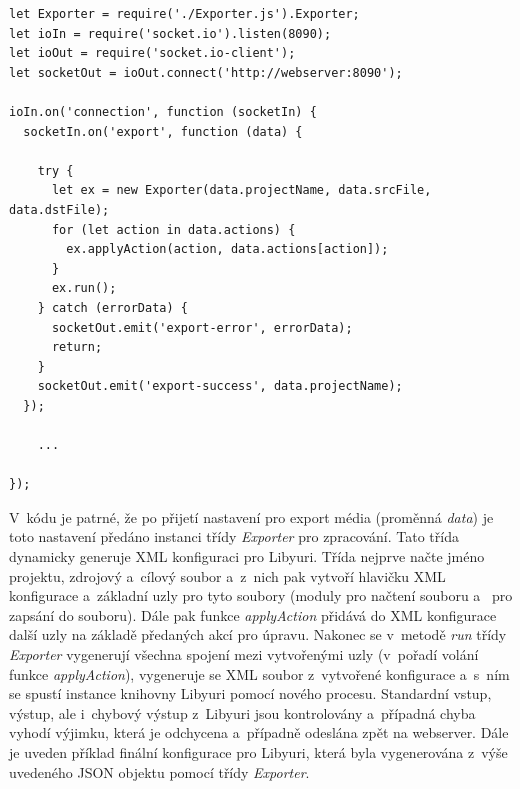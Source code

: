 \documentclass[thesis=M,czech]{FITthesis}[2012/06/26]
\begin{document}
\begin{lstlisting}[style=htmlcssjs]
let Exporter = require('./Exporter.js').Exporter;
let ioIn = require('socket.io').listen(8090);
let ioOut = require('socket.io-client');
let socketOut = ioOut.connect('http://webserver:8090');

ioIn.on('connection', function (socketIn) {
  socketIn.on('export', function (data) {

    try {
      let ex = new Exporter(data.projectName, data.srcFile, data.dstFile);
      for (let action in data.actions) {
        ex.applyAction(action, data.actions[action]);
      }
      ex.run();
    } catch (errorData) {
      socketOut.emit('export-error', errorData);
      return;
    }
    socketOut.emit('export-success', data.projectName);
  });
  
	...

});
\end{lstlisting}

V~kódu je patrné, že po přijetí nastavení pro export média (proměnná \textit{data}) je toto nastavení předáno instanci třídy \textit{Exporter} pro zpracování. Tato třída dynamicky generuje XML konfiguraci pro Libyuri. Třída nejprve načte jméno projektu, zdrojový a~cílový soubor a~z~nich pak vytvoří hlavičku XML konfigurace a~základní uzly pro tyto soubory (moduly  pro načtení souboru a~ pro zapsání do souboru). Dále pak funkce \textit{applyAction} přidává do XML konfigurace další uzly na základě předaných akcí pro úpravu. Nakonec se v~metodě \textit{run} třídy \textit{Exporter} vygenerují všechna spojení mezi vytvořenými uzly (v~pořadí volání funkce \textit{applyAction}), vygeneruje se XML soubor z~vytvořené konfigurace a~s~ním se spustí instance knihovny Libyuri pomocí nového procesu. Standardní vstup, výstup, ale i~chybový výstup z~Libyuri jsou kontrolovány a~případná chyba vyhodí výjimku, která je odchycena a~případně odeslána zpět na webserver. Dále je uveden příklad finální konfigurace pro Libyuri, která byla vygenerována z~výše uvedeného JSON objektu pomocí třídy \textit{Exporter}.\\
\end{document}

